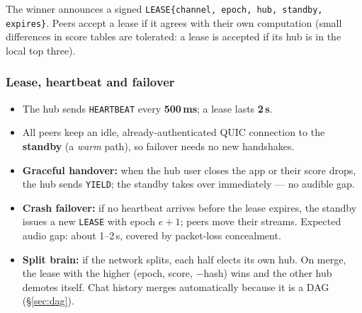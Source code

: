\documentclass[11pt,a4paper]{article}
\begin{document}
The winner announces a signed \texttt{LEASE\{channel, epoch, hub, standby, expires\}}.
Peers accept a lease if it agrees with their own computation (small differences in score
tables are tolerated: a lease is accepted if its hub is in the local top three).

\subsubsection{Lease, heartbeat and failover}
\begin{itemize}
  \item The hub sends \texttt{HEARTBEAT} every \textbf{500\,ms}; a lease lasts \textbf{2\,s}.
  \item All peers keep an idle, already-authenticated QUIC connection to the
        \textbf{standby} (a \emph{warm} path), so failover needs no new handshakes.
  \item \textbf{Graceful handover:} when the hub user closes the app or their score drops,
        the hub sends \texttt{YIELD}; the standby takes over immediately --- no audible gap.
  \item \textbf{Crash failover:} if no heartbeat arrives before the lease expires, the
        standby issues a new \texttt{LEASE} with epoch $e{+}1$; peers move their streams. Expected audio
        gap: about 1--2\,s, covered by packet-loss concealment.
  \item \textbf{Split brain:} if the network splits, each half elects its own hub. On merge,
        the lease with the higher (epoch, score, $-$hash) wins and the other hub demotes
        itself. Chat history merges automatically because it is a DAG (\S\ref{sec:dag}).
\end{itemize}
\end{document}
